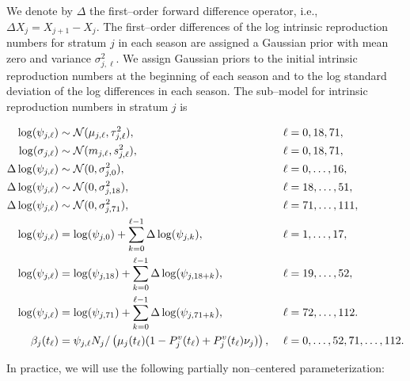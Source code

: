 We denote by $ \Delta $ the first--order forward difference operator, i.e., $ \Delta X_j = X_{j+1} - X_j $. The first--order differences of the log intrinsic reproduction numbers for stratum $ j $ in each season are assigned a Gaussian prior with mean zero and variance $ \sigma^2_{j,\ell} $. We assign Gaussian priors to the initial intrinsic reproduction numbers at the beginning of each season and to the log standard deviation of the log differences in each season. The sub--model for intrinsic reproduction numbers in stratum $ j $ is
\begin{small}
	\begin{align}
	\log(\psi_{j,\ell}) &\sim \mcN(\mu_{j,\ell},\tau_{j,\ell}^2),&\ &\ell= 0,18,71, \nonumber\\
	\log(\sigma_{j,\ell}) &\sim \mcN(m_{j,\ell}, s_{j,\ell}^2),&\ &\ell=0,18,71, \nonumber\\
	\Delta\log(\psi_{j,\ell})&\sim \mcN(0, \sigma^2_{j,0}),&\ &\ell=0,\dots,16, \nonumber\\
	\Delta\log(\psi_{j,\ell})&\sim \mcN(0, \sigma^2_{j,18}),&\ &\ell=18,\dots,51, \nonumber\\
	\Delta\log(\psi_{j,\ell})&\sim \mcN(0, \sigma^2_{j,71}),&\ &\ell=71,\dots,111, \nonumber\\
	\log(\psi_{j,\ell}) &= \log(\psi_{j,0}) + \sum_{k=0}^{\ell-1}\Delta\log(\psi_{j,k}),&\ &\ell = 1,\dots,17, \nonumber\\
	\log(\psi_{j,\ell}) &= \log(\psi_{j,18}) + \sum_{k=0}^{\ell-1}\Delta\log(\psi_{j,18+k}),&\ &\ell = 19,\dots,52, \nonumber\\
	\log(\psi_{j,\ell}) &= \log(\psi_{j,71}) + \sum_{k=0}^{\ell-1}\Delta\log(\psi_{j,71+k}),&\ &\ell = 72,\dots,112. \nonumber \\
	\beta_j(t_\ell) &= \psi_{j,\ell}N_j/\left (\mu_{j}(t_\ell)(1 - P^v_j(t_\ell) + P_j^v(t_\ell)\nu_j)\right ),&\ &\ell=0,\dots,52,71,\dots,112. \nonumber
	\end{align}
\end{small}
In practice, we will use the following partially non--centered parameterization:
